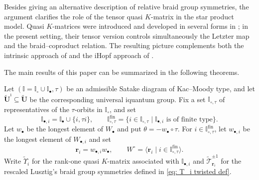 \documentclass[a4paper,reqno,12pt]{amsart}
\numberwithin{equation}{section}
\theoremstyle{definition}
\theoremstyle{plain}
\theoremstyle{definition}
\def\I{\mathbb I}
\def\bI{\I_\bullet}
\def\wI{\I_\circ}
\def\bIi{\I_{\bullet,i}}
\def\bw{w_\bullet}
\def\bwi{w_{\bullet,i}}
\def\br{\mathbf r}
\def\tU{\widetilde{\mathbf U}}
\def\tUi{\widetilde{\mathbf U}^{\imath}}
\def\tT{\widetilde{\mathscr T}}
\def\tfX{\widetilde\Upsilon}
\def \wItau{\I_{\circ,\tau}}
\def \fwItau{\wItau^{\mathrm{fin}}}
\begin{document}
Besides giving an alternative description of relative braid group symmetries, the argument clarifies the role of the tensor quasi $K$-matrix in the star product model.  Quasi $K$-matrices were introduced and developed in several forms in \cite{BW18b,BK19,AV22}; in the present setting, their tensor version controls simultaneously the Letzter map and the braid--coproduct relation.  The resulting picture complements both the intrinsic approach of \cite{WZ23,Z23} and the $\mathrm i$Hopf approach of \cite{CLPRW25}.
\fi

The main results of this paper can be summarized in the following
theorems.

Let $(\I=\wI\cup\bI,\tau)$ be an admissible Satake diagram of
Kac--Moody type, and let $\tUi\subseteq\tU$ be the corresponding
universal iquantum group. Fix a set $\wItau$ of representatives of
the $\tau$-orbits in $\wI$, and set
\[
  \bIi=\bI\cup\{i,\tau i\},\qquad
  \fwItau=\{i\in\wItau\mid\bIi\text{ is of finite type}\}.
\]
Let $\bw$ be the longest element of $W_\bullet$ and put
$\theta=-\bw\circ\tau$. For $i\in\fwItau$, let $\bwi$ be the
longest element of $W_{\bullet,i}$ and set
\[
  \br_i=\bwi\bw,\qquad
  W^\circ=\langle\br_i\mid i\in\fwItau\rangle.
\]
Write $\tfX_i$ for the rank-one quasi $K$-matrix associated with
$\bIi$ and $\tT_{\br_i}^{\pm1}$ for the rescaled Lusztig's braid group
symmetries defined in \eqref{eq: T_i twisted def}. 
\end{document}
